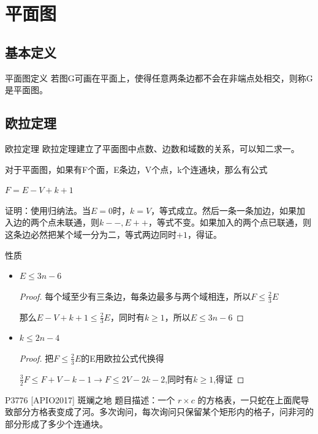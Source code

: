 \section{平面图}

\subsection{基本定义}

\begin{frame}{平面图定义}
若图G可画在平面上，使得任意两条边都不会在非端点处相交，则称G是平面图。
\end{frame}

\subsection{欧拉定理}
\begin{frame}{欧拉定理}
欧拉定理建立了平面图中点数、边数和域数的关系，可以知二求一。 \newline \newline

对于平面图，如果有F个面，E条边，V个点，k个连通块，那么有公式

$F=E-V+k+1$

证明：使用归纳法。当$E=0$时，$k=V$，等式成立。然后一条一条加边，如果加入边的两个点未联通，则$k--,E++$，等式不变。如果加入的两个点已联通，则这条边必然把某个域一分为二，等式两边同时$+1$，得证。
\end{frame}

\begin{frame}{性质}
\begin{itemize}
    \item $E \le 3n-6$
        \begin{proof}
            每个域至少有三条边，每条边最多与两个域相连，所以$F \le \frac{2}{3}E$

            那么$E-V+k+1 \le \frac{2}{3}E$，同时有$k \ge 1$，所以$E \le 3n-6$
        \end{proof}
    \item $k \le 2n-4$
        \begin{proof}
            把$F \le \frac{2}{3}E$的E用欧拉公式代换得

            $\frac{3}{2}F \le F+V-k-1 \rightarrow F \le 2V-2k-2$,同时有$k \ge 1$,得证
        \end{proof}
\end{itemize}
\end{frame}

\begin{frame}{P3776 [APIO2017] 斑斓之地}
    题目描述：一个 $r \times c$ 的方格表，一只蛇在上面爬导致部分方格表变成了河。多次询问，每次询问只保留某个矩形内的格子，问非河的部分形成了多少个连通块。
\end{frame}

